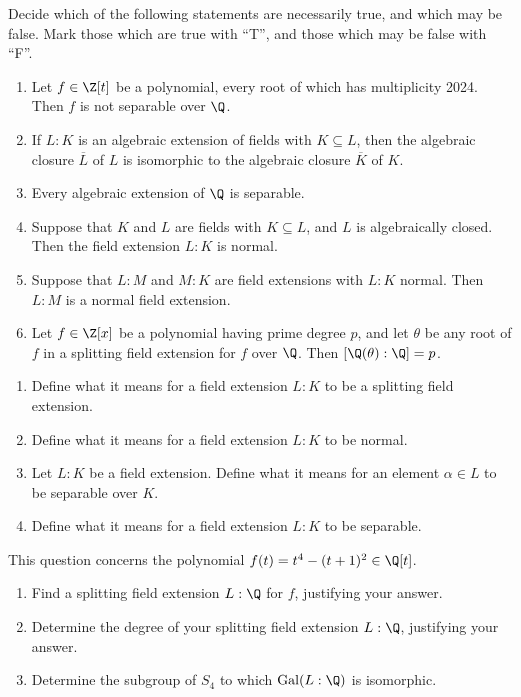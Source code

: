 \documentclass{article}
\begin{document}
\setcounter{section}{2}
 Decide which of the following statements are necessarily true, and which may be false.
Mark those which are true with ``T'', and those which may be false with ``F''.
\begin{enumerate}[label=(\alph*)]
  \item Let \( f \in \Z[t] \) be a polynomial, every root of which has multiplicity 2024.
  Then \( f \) is not separable over \( \Q \).
  \item If \( L : K \) is an algebraic extension of fields with \( K \subseteq L \), then the algebraic closure \( \overline{L} \) of \( L \) is isomorphic to the algebraic closure \( \overline{K} \) of \( K \).
  \item Every algebraic extension of \( \Q \) is separable.
  \item Suppose that \( K \) and \( L \) are fields with \( K \subseteq L \), and \( L \) is algebraically closed.
  Then the field extension \( L : K \) is normal.
  \item Suppose that \( L : M \) and \( M : K \) are field extensions with \( L : K \) normal. Then \( L : M \) is a normal field extension.
  \item Let \( f \in \Z[x] \) be a polynomial having prime degree \( p \), and let \( \theta \) be any root of \( f \) in a splitting field extension for \( f \) over \( \Q \). Then \( [\Q(\theta) : \Q] = p \).
\end{enumerate}

\begin{enumerate}[label=(\alph*)]
  \item Define what it means for a field extension \( L : K \) to be a splitting field extension.
  \item Define what it means for a field extension \( L : K \) to be normal.
  \item Let \( L : K \) be a field extension. Define what it means for an element \( \alpha \in L \) to be separable over \( K \).
  \item Define what it means for a field extension \( L : K \) to be separable.
\end{enumerate}


 This question concerns the polynomial \( f(t) = t^4 - (t+1)^2 \in \Q[t] \).
\begin{enumerate}[label=(\alph*)]
  \item Find a splitting field extension \( L : \Q \) for \( f \), justifying your answer.
  \item Determine the degree of your splitting field extension \( L : \Q \), justifying your answer.
  \item Determine the subgroup of \( S_4 \) to which \( \mathrm{Gal}(L : \Q) \) is isomorphic.
\end{enumerate}
\end{document}
